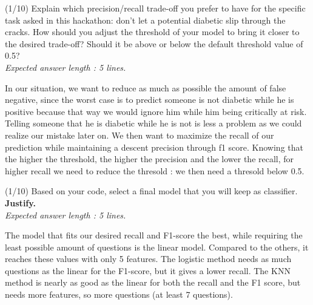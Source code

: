 \documentclass [a4paper, 11pt] {article}
\begin{document}
\begin{question}{2.2}
(1/10) Explain which precision/recall trade-off you prefer to have for the specific task asked in this hackathon: don't let a potential diabetic slip through the cracks. How should you adjust the threshold of your model to bring it closer to the desired trade-off? Should it be above or below the default threshold value of 0.5?\\
\textit{Expected answer length : 5 lines.}
\end{question}
\begin{answer}\color{blue}
In our situation, we want to reduce as much as possible the amount of false negative, since the worst case is to predict someone is not diabetic while he is positive because that way we would ignore him while him being critically at risk. Telling someone that he is diabetic while he is not is less a problem as we could realize our mistake later on. We then want to maximize the recall of our prediction while maintaining a descent precision through f1 score. 
Knowing that the higher the threshold, the higher the precision and the lower the recall, for higher recall we need to reduce the thresold : we then need a thresold below 0.5. 
\end{answer}

\begin{question}{2.3}
(1/10) Based on your code, select a final model that you will keep as classifier. \textbf{Justify.} \\
\textit{Expected answer length : 5 lines.}
\end{question}
\begin{answer} \color{blue}
The model that fits our desired recall and F1-score the best, while requiring the least possible amount of questions is the linear model. Compared to the others, it reaches these values with only 5 features.
The logistic method needs as much questions as the linear for the F1-score, but it gives a lower recall. The KNN method is nearly as good as the linear for both the recall and the F1 score, but needs more features, so more questions (at least 7 questions).

\end{answer}
\end{document}
